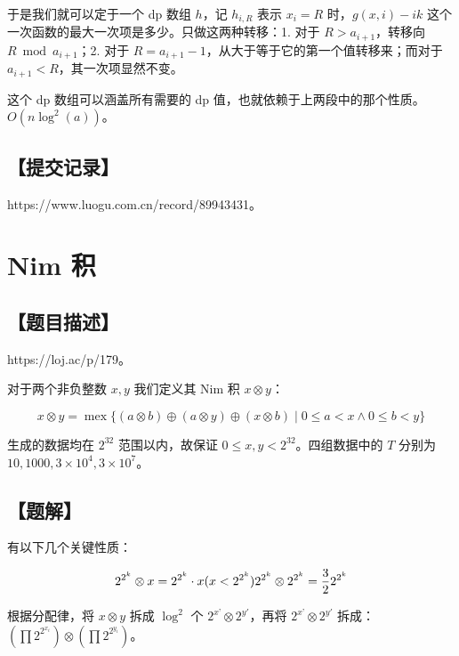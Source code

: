 \documentclass[UTF8,12pt,a4paper]{ctexart}
\begin{document}
	于是我们就可以定于一个 dp 数组 $h$，记 $h_{i,R}$ 表示 $x_i=R$ 时，$g(x,i)-ik$ 这个一次函数的最大一次项是多少。只做这两种转移：1. 对于 $R>a_{i+1}$，转移向 $R\bmod a_{i+1}$；2. 对于 $R=a_{i+1}-1$，从大于等于它的第一个值转移来；而对于 $a_{i+1}<R$，其一次项显然不变。
	
	这个 dp 数组可以涵盖所有需要的 dp 值，也就依赖于上两段中的那个性质。$O(n\log^2(a))$。
	
	\subsection*{【提交记录】}
	
	https://www.luogu.com.cn/record/89943431。
	
	
	\section*{Nim 积}
	
	\subsection*{【题目描述】}
	
	https://loj.ac/p/179。
	
	对于两个非负整数 $x, y$ 我们定义其 Nim 积 $x\otimes y$：
	
	$$
	x \otimes y = \operatorname {mex} \{ (a\otimes b) \oplus (a\otimes y) \oplus (x\otimes b) \mid 0\le a < x \wedge 0\le b < y  \}
	$$
	
	生成的数据均在 $2^{32}$ 范围以内，故保证 $0\le x, y < 2^{32}$。四组数据中的 $T$ 分别为 $10, 1000, 3\times 10^4, 3\times 10^7$。
	
	\subsection*{【题解】}
	
	有以下几个关键性质：
	
	$$
	2^{2^k}\otimes x=2^{2^k}\cdot x (x<2^{2^k})\\
	2^{2^k}\otimes 2^{2^k} = \frac 32 2^{2^k}\\
	$$
	
	根据分配律，将 $x\otimes y$ 拆成 $\log^2$ 个 $2^{x’}\otimes 2^{y'}$，再将 $2^{x’}\otimes 2^{y'}$ 拆成：$\left(\prod 2^{2^{x_i}}\right)\otimes \left(\prod 2^{2^{y_i}}\right)$。
	
\end{document}
